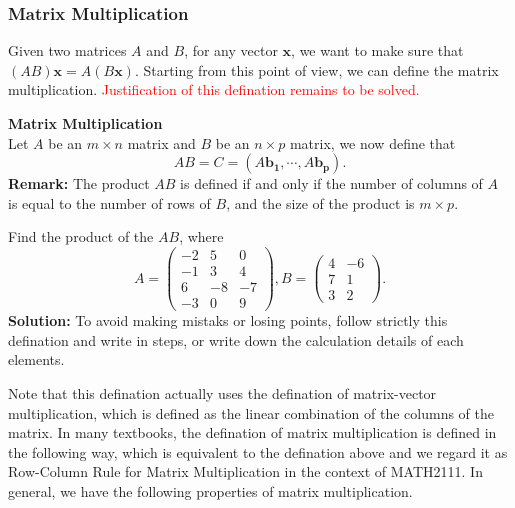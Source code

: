 \documentclass[10pt, a4paper]{article}
\begin{document}
\subsubsection*{Matrix Multiplication}
Given two matrices $A$ and $B$, for any vector $\mathbf{x}$, we want to make sure that $(AB)\mathbf{x} = A(B\mathbf{x})$.
Starting from this point of view, we can define the matrix multiplication. \textcolor{red}{Justification of this defination remains to be solved.}
\begin{definition}
    \textbf{Matrix Multiplication}\\
    Let $A$ be an $m\times n$ matrix and $B$ be an $n\times p$ matrix, we now define that $$A B = C = (A\mathbf{b_1}, \cdots, A\mathbf{b_p}).$$
    \textbf{Remark:} The product $AB$ is defined if and only if the number of columns of $A$ is equal to the number of rows of $B$, and the size of the product is $m\times p$.
\end{definition}
\begin{example}
    Find the product of the $AB$, where\[
        A = \begin{pmatrix} -2 & 5 & 0 \\ -1 & 3 & 4 \\ 6 & -8 & -7 \\ -3 & 0 & 9 \end{pmatrix}, B = \begin{pmatrix} 4 & -6 \\ 7 & 1 \\ 3 & 2 \end{pmatrix}.
    \]
    \textbf{Solution:} To avoid making mistaks or losing points, follow strictly this defination and write in steps, or write down the calculation details of each elements.
\end{example}
Note that this defination actually uses the defination of matrix-vector multiplication, which is defined as the linear combination of the columns of the matrix.
In many textbooks, the defination of matrix multiplication is defined in the following way, which is equivalent to the defination above and we regard it as Row-Column Rule for Matrix Multiplication in the context of MATH2111.
In general, we have the following properties of matrix multiplication.
\end{document}
